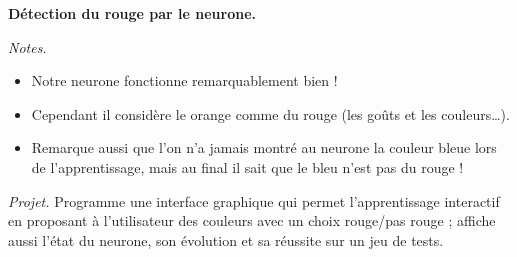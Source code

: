 \documentclass[10pt,class=report,crop=false]{standalone}
\begin{document}
\begin{activite}[Neurone]
\begin{enumerate}
\begin{center}
\begin{tabular}{|c|c|c|c|c|}
	\end{tabular}

  {\bf Détection du rouge par le neurone.}
\end{center} 	
	
	\medskip
	
\emph{Notes.} 
\begin{itemize}
	\item Notre neurone fonctionne remarquablement bien ! 
	\item Cependant il considère le orange comme du rouge (les goûts et les couleurs\ldots).
	\item Remarque aussi que l'on n'a jamais montré au neurone la couleur bleue lors de l'apprentissage, mais au final il sait que le bleu n'est pas du rouge !
\end{itemize}	
	
\end{enumerate}


\emph{Projet.} Programme une interface graphique qui permet l'apprentissage interactif en proposant à l'utilisateur des couleurs avec un choix \og{}rouge/pas rouge\fg{} ; affiche aussi l'état du neurone, son évolution et sa réussite sur un jeu de tests.
\end{activite}
\end{document}
